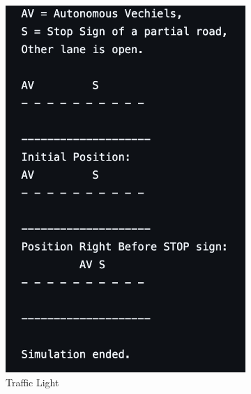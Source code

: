 \documentclass[conference]{IEEEtran}
\begin{document}
\begin{figure}[h] %
    \centering
    \begin{subfigure}[b]{0.3\textwidth}
        \includegraphics[width=\linewidth]{Fig/PL_Stop_S1.png}
        \caption{Traffic Light}
    \end{subfigure}
    \hfill
    \begin{subfigure}[b]{0.3\textwidth}

\end{subfigure}
\end{figure}
\end{document}
